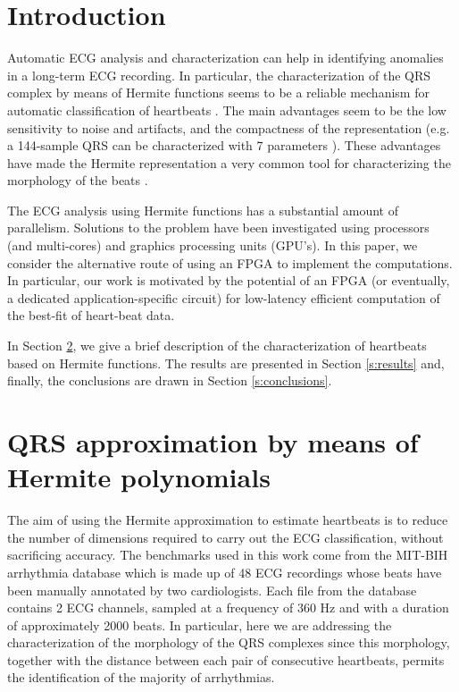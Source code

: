 \documentclass[runningheads]{llncs}
\begin{document}
\section{Introduction}

Automatic ECG analysis and characterization can help in 
identifying anomalies in a long-term ECG recording. 
In particular, the characterization of the QRS complex by means of Hermite functions 
seems to be a reliable mechanism  for automatic classification of heartbeats \cite{j:lagerholm00}. 
The main advantages seem to be the low sensitivity to noise and artifacts, and the
compactness of the representation (e.g. a 144-sample QRS can be characterized with 7 parameters \cite{c:marquez13}). 
These advantages have made the Hermite representation a very common tool for characterizing the 
morphology of the beats \cite{j:lagerholm00,c:marquez13,c:braccini97,j:linh03a,j:linh03b}. 

The ECG analysis using Hermite functions has a
substantial amount of parallelism.  Solutions to the problem have been investigated
using processors (and multi-cores) and graphics processing units (GPU's). 
In this paper, we consider the alternative route of using an FPGA to implement
the computations.  In particular, our work is motivated by the potential
of an FPGA (or eventually, a dedicated application-specific circuit) for low-latency
efficient computation of the best-fit of heart-beat data.


In Section \ref{s:arr}, we give a brief description of
the characterization of heartbeats based on Hermite functions. The results are presented in Section \ref{s:results} and, finally, the conclusions are drawn in Section \ref{s:conclusions}.

\section{QRS approximation by means of Hermite polynomials}\label{s:arr}
The aim of using the Hermite approximation to estimate heartbeats is to reduce the number of dimensions required to carry out the ECG classification, without sacrificing accuracy. The benchmarks used in this work come from the MIT-BIH arrhythmia database \cite{j:moody01} which is made up of 48 ECG recordings whose beats  have been manually
annotated by two cardiologists. Each file from the database contains 2 ECG channels, sampled at a frequency of 360 Hz and with a duration of approximately 2000 beats. In particular, here we are addressing the characterization of the morphology of the QRS complexes since this morphology, together with the distance between each pair of consecutive heartbeats, permits the identification of the majority of arrhythmias.
\end{document}
